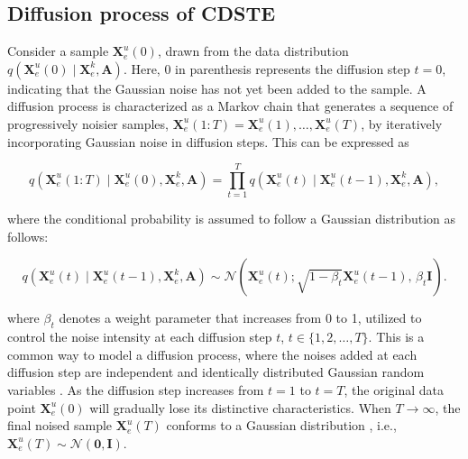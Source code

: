 \documentclass[a4paper,fleqn,12pt]{cas-sc}
\begin{document}
\subsection{Diffusion process of CDSTE}\label{sec:CDSTEdiffusion}
Consider a sample $\boldsymbol{X}^{u}_{e}(0)$, drawn from the data distribution $q\left(\boldsymbol{X}^{u}_{e}(0) \mid \boldsymbol{X}^{k}_{e}, \boldsymbol{A}\right)$. Here, $0$ in parenthesis represents the diffusion step $t=0$, indicating that the Gaussian noise has not yet been added to the sample. A diffusion process is characterized as a Markov chain that generates a sequence of progressively noisier samples, $\boldsymbol{X}^{u}_{e}(1:T) = \boldsymbol{X}^{u}_{e}(1), \ldots, \boldsymbol{X}^{u}_{e}(T)$, by iteratively incorporating Gaussian noise in diffusion steps. This can be expressed as
\begin{linenomath*}
\begin{equation}
q\left(\boldsymbol{X}^{u}_{e}(1:T) \mid \boldsymbol{X}^{u}_{e}(0), \boldsymbol{X}^{k}_{e}, \boldsymbol{A}\right)=\prod_{t=1}^{T} q \left( \boldsymbol{X}^{u}_{e}(t) \mid \boldsymbol{X}^{u}_{e}(t-1), \boldsymbol{X}^{k}_{e}, \boldsymbol{A}\right),
\end{equation}
\end{linenomath*}
where the conditional probability is assumed to follow a Gaussian distribution as follows:
\begin{linenomath*}
\begin{equation}
q \left( \boldsymbol{X}^{u}_{e}(t) \mid \boldsymbol{X}^{u}_{e}(t-1), \boldsymbol{X}^{k}_{e}, \boldsymbol{A}\right)\sim\mathcal{N}\left(\boldsymbol{X}^{u}_{e}(t) ; \sqrt{1-\beta_t} \boldsymbol{X}^{u}_{e}(t-1),\, \beta_t \boldsymbol{I}\right).
\end{equation}
\end{linenomath*}
where $\beta_{t}$ denotes a weight parameter that increases from 0 to 1, utilized to control the noise intensity at each diffusion step $t$, $t\in\{1,2,\ldots,T\}$. This is a common way to model a diffusion process, where the noises added at each diffusion step are independent and identically distributed Gaussian random variables \citep{song2020denoising}. As the diffusion step increases from $t=1$ to $t=T$, the original data point $\boldsymbol{X}^{u}_{e}(0)$ will gradually lose its distinctive characteristics. When $T\rightarrow \infty$, the final noised sample $\boldsymbol{X}^{u}_{e}(T)$ conforms to a Gaussian distribution \citep{song2020improved}, i.e., $\boldsymbol{X}^{u}_{e}(T)\sim\mathcal{N}\left(\boldsymbol{0}, \boldsymbol{I}\right)$.
\end{document}
